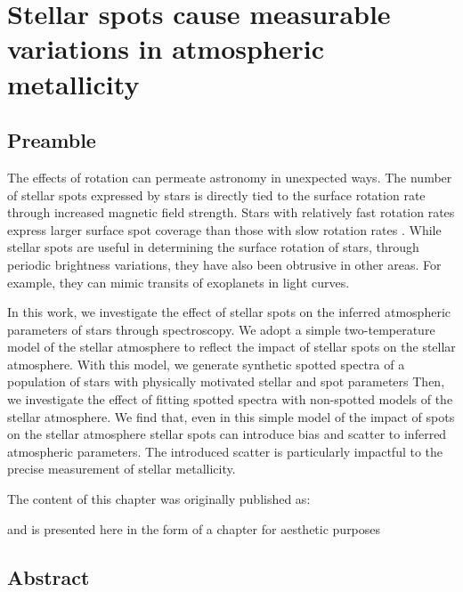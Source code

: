 


\chapter{Stellar spots cause measurable variations in atmospheric metallicity}
\label{chap:stellar_spots}

\section*{Preamble}

The effects of rotation can permeate astronomy in unexpected ways.
The number of stellar spots expressed by stars is directly tied to the surface rotation rate through increased magnetic field strength.
Stars with relatively fast rotation rates express larger surface spot coverage than those with slow rotation rates \citep{cao_starspots_2022}.
While stellar spots are useful in determining the surface rotation of stars, through periodic brightness variations, they have also been obtrusive in other areas.
For example, they can mimic transits of exoplanets in light curves.

In this work, we investigate the effect of stellar spots on the inferred atmospheric parameters of stars through spectroscopy.
We adopt a simple two-temperature model of the stellar atmosphere to reflect the impact of stellar spots on the stellar atmosphere.
With this model, we generate synthetic spotted spectra of a population of stars with physically motivated stellar and spot parameters
Then, we investigate the effect of fitting spotted spectra with non-spotted models of the stellar atmosphere.
We find that, even in this simple model of the impact of spots on the stellar atmosphere stellar spots can introduce bias and scatter to inferred atmospheric parameters.
The introduced scatter is particularly impactful to the precise measurement of stellar metallicity.


The content of this chapter was originally published as:
\begin{quote}
	\citet{tanner_ss}
\end{quote}
and is presented here in the form of a chapter for aesthetic purposes 

\newpage

\section*{Abstract}

